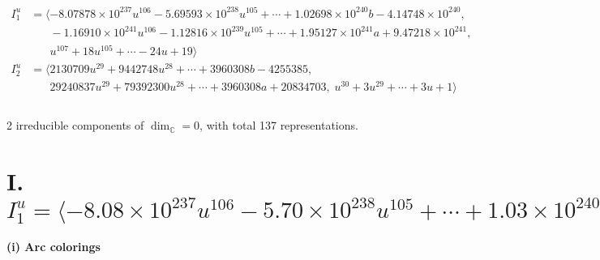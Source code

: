 \documentclass[1p]{elsarticle_modified}
\theoremstyle{definition}
\begin{document}
\begin{align*}
I^u_{1}&=\langle 
-8.07878\times10^{237} u^{106}-5.69593\times10^{238} u^{105}+\cdots+1.02698\times10^{240} b-4.14748\times10^{240},\\
\phantom{I^u_{1}}&\phantom{= \langle  }-1.16910\times10^{241} u^{106}-1.12816\times10^{239} u^{105}+\cdots+1.95127\times10^{241} a+9.47218\times10^{241},\\
\phantom{I^u_{1}}&\phantom{= \langle  }u^{107}+18 u^{105}+\cdots-24 u+19\rangle \\
I^u_{2}&=\langle 
2130709 u^{29}+9442748 u^{28}+\cdots+3960308 b-4255385,\\
\phantom{I^u_{2}}&\phantom{= \langle  }29240837 u^{29}+79392300 u^{28}+\cdots+3960308 a+20834703,\;u^{30}+3 u^{29}+\cdots+3 u+1\rangle \\
\\
\end{align*}
\raggedright * 2 irreducible components of $\dim_{\mathbb{C}}=0$, with total 137 representations.\\
\newpage
\renewcommand{\arraystretch}{1}
\centering \section*{I. $I^u_{1}= \langle -8.08\times10^{237} u^{106}-5.70\times10^{238} u^{105}+\cdots+1.03\times10^{240} b-4.15\times10^{240},\;-1.17\times10^{241} u^{106}-1.13\times10^{239} u^{105}+\cdots+1.95\times10^{241} a+9.47\times10^{241},\;u^{107}+18 u^{105}+\cdots-24 u+19 \rangle$}
\flushleft \textbf{(i) Arc colorings}\\
\end{document}
